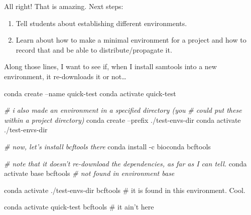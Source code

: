 \documentclass[]{krantz}
\makeatletter
\newenvironment{Shaded}{\begin{snugshade}}{\end{snugshade}}
\newcommand{\CommentTok}[1]{\textcolor[rgb]{0.37,0.37,0.37}{\textit{#1}}}
\newcommand{\ExtensionTok}[1]{#1}
\newcommand{\KeywordTok}[1]{\textcolor[rgb]{0.27,0.27,0.27}{\textbf{#1}}}
\newcommand{\NormalTok}[1]{#1}
\newcommand{\OperatorTok}[1]{\textcolor[rgb]{0.43,0.43,0.43}{\textbf{#1}}}
\newcommand{\StringTok}[1]{\textcolor[rgb]{0.5,0.5,0.5}{#1}}
\providecommand{\tightlist}{%
  \setlength{\itemsep}{0pt}\setlength{\parskip}{0pt}}
\newenvironment{kframe}{%
\medskip{}
\setlength{\fboxsep}{.8em}
 \def\at@end@of@kframe{}%
 \ifinner\ifhmode%
  \def\at@end@of@kframe{\end{minipage}}%
  \begin{minipage}{\columnwidth}%
 \fi\fi%
 \def\FrameCommand##1{\hskip\@totalleftmargin \hskip-\fboxsep
 \colorbox{shadecolor}{##1}\hskip-\fboxsep
     \hskip-\linewidth \hskip-\@totalleftmargin \hskip\columnwidth}%
 \MakeFramed {\advance\hsize-\width
   \@totalleftmargin\z@ \linewidth\hsize
   \@setminipage}}%
 {\par\unskip\endMakeFramed%
 \at@end@of@kframe}
\renewenvironment{Shaded}{\begin{kframe}}{\end{kframe}}
\makeatother
\begin{document}
\begin{Shaded}
\end{Shaded}

All right! That is amazing. Next steps:

\begin{enumerate}
\def\labelenumi{\arabic{enumi}.}
\tightlist
\item
  Tell students about establishing different environments.
\item
  Learn about how to make a minimal environment for a project and how to
  record that and be able to distribute/propagate it.
\end{enumerate}

Along those lines, I want to see if, when I install samtools into a new environment,
it re-downloads it or not\ldots{}

\begin{Shaded}
\begin{Highlighting}[]
\ExtensionTok{conda}\NormalTok{ create --name quick-test}
\ExtensionTok{conda}\NormalTok{ activate quick-test}

\CommentTok{# i also made an environment in a specified directory (you}
\CommentTok{# could put these within a project directory)}
\ExtensionTok{conda}\NormalTok{ create --prefix ./test-envs-dir }
\ExtensionTok{conda}\NormalTok{ activate ./test-envs-dir}

\CommentTok{# now, let's install bcftools there}
\ExtensionTok{conda}\NormalTok{ install -c bioconda bcftools}

\CommentTok{# note that it doesn't re-download the dependencies, as far as I can tell.}
\ExtensionTok{conda}\NormalTok{ activate base}
\ExtensionTok{bcftools} \CommentTok{# not found in environment base}

\ExtensionTok{conda}\NormalTok{ activate ./test-envs-dir}
\ExtensionTok{bcftools}\NormalTok{  # it is found in this environment.  Cool.}

\ExtensionTok{conda}\NormalTok{ activate quick-test}
\ExtensionTok{bcftools}\NormalTok{  # it ain}\StringTok{'t here}
\end{Highlighting}
\end{Shaded}
\end{document}
